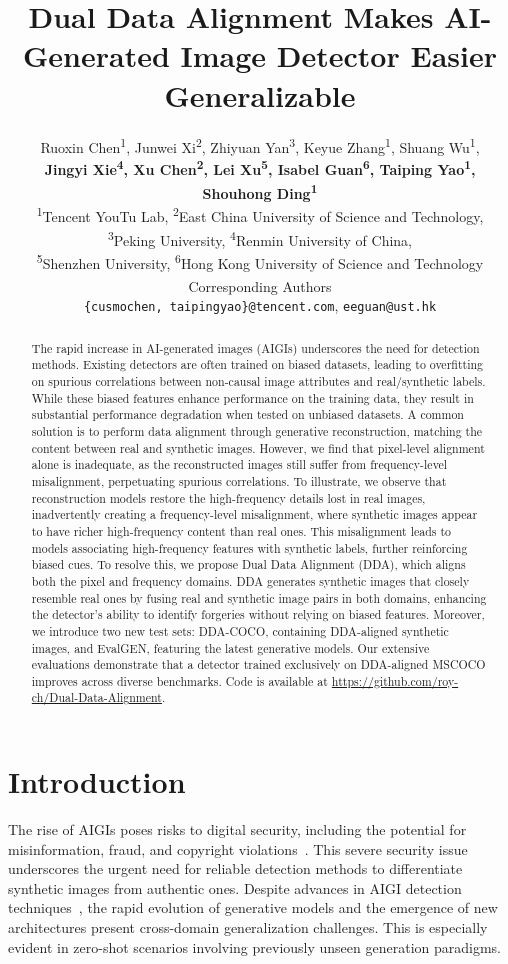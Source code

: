 \documentclass{article}
\title{Dual Data Alignment Makes AI-Generated Image Detector Easier Generalizable}
\author{
Ruoxin Chen\textsuperscript{1}, 
Junwei Xi\textsuperscript{2},
Zhiyuan Yan\textsuperscript{3}, 
Keyue Zhang\textsuperscript{1},  
Shuang Wu\textsuperscript{1}, \\
\textbf{Jingyi Xie\textsuperscript{4},
Xu Chen\textsuperscript{2},
Lei Xu\textsuperscript{5},
Isabel Guan\textsuperscript{6\dag},
Taiping Yao\textsuperscript{1\dag},
Shouhong Ding\textsuperscript{1}} \\
\textsuperscript{1}Tencent YouTu Lab, 
\textsuperscript{2}East China University of Science and Technology, \\
\textsuperscript{3}Peking University, 
\textsuperscript{4}Renmin University of China, \\
\textsuperscript{5}Shenzhen University, 
\textsuperscript{6}Hong Kong University of Science and Technology \\
\textsuperscript{\dag} Corresponding Authors \\
\texttt{{\{cusmochen, taipingyao\}}@tencent.com}, \texttt{eeguan@ust.hk}
}
\begin{document}
\maketitle

\begin{abstract}
\label{sec:abstract}
The rapid increase in AI-generated images (AIGIs) underscores the need for detection methods. 
Existing detectors are often trained on biased datasets, leading to overfitting on spurious correlations between non-causal image attributes and real/synthetic labels.
While these biased features enhance performance on the training data, they result in substantial performance degradation when tested on unbiased datasets.
A common solution is to perform data alignment through generative reconstruction, matching the content between real and synthetic images. 
However, we find that pixel-level alignment alone is inadequate, as the reconstructed images still suffer from frequency-level misalignment, perpetuating spurious correlations.
To illustrate, we observe that reconstruction models restore the high-frequency details lost in real images, inadvertently creating a frequency-level misalignment, where synthetic images appear to have richer high-frequency content than real ones. This misalignment leads to models associating high-frequency features with synthetic labels, further reinforcing biased cues.
To resolve this, we propose Dual Data Alignment (DDA), which aligns both the pixel and frequency domains. 
DDA generates synthetic images that closely resemble real ones by fusing real and synthetic image pairs in both domains, enhancing the detector's ability to identify forgeries without relying on biased features.
Moreover, we introduce two new test sets: DDA-COCO, containing DDA-aligned synthetic images, and EvalGEN, featuring the latest generative models. Our extensive evaluations demonstrate that a detector trained exclusively on DDA-aligned MSCOCO improves across diverse benchmarks. 
Code is available at \url{https://github.com/roy-ch/Dual-Data-Alignment}.
\end{abstract}

\section{Introduction}
\label{sec:intro}

The rise of AIGIs \cite{goodfellow2014generative, ho2020denoising, van2016pixel,yan2025can} poses risks to digital security, including the potential for misinformation, fraud, and copyright violations~\cite{goodfellow2014generative,karras2018progressive,karras2019style,ho2020denoising,rombach2022high,zhang2023controlvideo,yan2025gpt,yan2024df40,yan2025ns,li2025artificial,song2024anti}. This severe security issue underscores the urgent need for reliable detection methods to differentiate synthetic images from authentic ones. Despite advances in AIGI detection techniques~\cite{chen2024drct,ojha2023towards,sha2023fake}, the rapid evolution of generative models and the emergence of new architectures present cross-domain generalization challenges. This is especially evident in zero-shot scenarios involving previously unseen generation paradigms.
\end{document}
